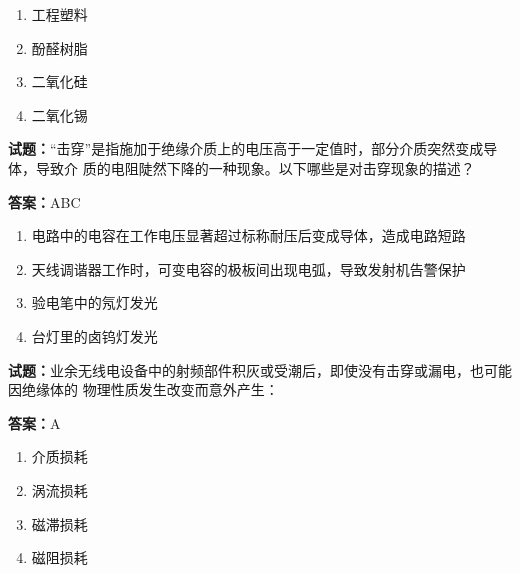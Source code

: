 \documentclass{ctexbook}
\begin{document}
\begin{enumerate}[leftmargin=3em]
  \item 工程塑料 

  \item 酚醛树脂 

  \item 二氧化硅 

  \item 二氧化锡 

\end{enumerate}





\vspace{1em}

\textbf{试题：}“击穿”是指施加于绝缘介质上的电压高于一定值时，部分介质突然变成导体，导致介
质的电阻陡然下降的一种现象。以下哪些是对击穿现象的描述？ 

\textbf{答案：}ABC 

\begin{enumerate}[leftmargin=3em]
  \item 电路中的电容在工作电压显著超过标称耐压后变成导体，造成电路短路 

  \item 天线调谐器工作时，可变电容的极板间出现电弧，导致发射机告警保护 

  \item 验电笔中的氖灯发光 

  \item 台灯里的卤钨灯发光 

\end{enumerate}





\vspace{1em}

\textbf{试题：}业余无线电设备中的射频部件积灰或受潮后，即使没有击穿或漏电，也可能因绝缘体的
物理性质发生改变而意外产生： 

\textbf{答案：}A 

\begin{enumerate}[leftmargin=3em]
  \item 介质损耗 

  \item 涡流损耗 

  \item 磁滞损耗 

  \item 磁阻损耗 

\end{enumerate}
\end{document}

